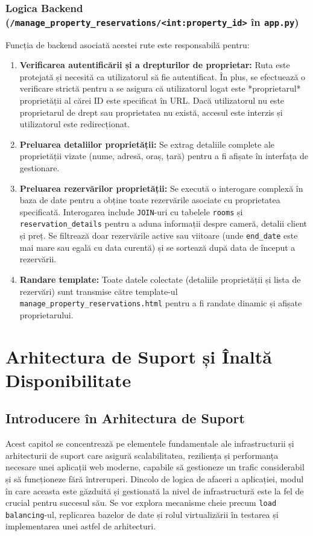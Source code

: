 \documentclass[12pt, a4paper, oneside, romanian]{teza-upb}
\begin{document}
\subsection{Logica Backend (\texttt{/manage\_property\_reservations/<int:property\_id>} în \texttt{app.py})}
Funcția de backend asociată acestei rute este responsabilă pentru:
\begin{enumerate}
	\item \textbf{Verificarea autentificării și a drepturilor de proprietar:} Ruta este protejată și necesită ca utilizatorul să fie autentificat. În plus, se efectuează o verificare strictă pentru a se asigura că utilizatorul logat este *proprietarul* proprietății al cărei ID este specificat în URL. Dacă utilizatorul nu este proprietarul de drept sau proprietatea nu există, accesul este interzis și utilizatorul este redirecționat.
	\item \textbf{Preluarea detaliilor proprietății:} Se extrag detaliile complete ale proprietății vizate (nume, adresă, oraș, țară) pentru a fi afișate în interfața de gestionare.
	\item \textbf{Preluarea rezervărilor proprietății:} Se execută o interogare complexă în baza de date pentru a obține toate rezervările asociate cu proprietatea specificată. Interogarea include \texttt{JOIN}-uri cu tabelele \texttt{rooms} și \texttt{reservation\_details} pentru a aduna informații despre cameră, detalii client și preț. Se filtrează doar rezervările active sau viitoare (unde \texttt{end\_date} este mai mare sau egală cu data curentă) și se sortează după data de început a rezervării.
	\item \textbf{Randare template:} Toate datele colectate (detaliile proprietății și lista de rezervări) sunt transmise către template-ul \texttt{manage\_property\_reservations.html} pentru a fi randate dinamic și afișate proprietarului.
\end{enumerate}



\chapter{Arhitectura de Suport și Înaltă Disponibilitate}

\section*{Introducere în Arhitectura de Suport}
Acest capitol se concentrează pe elementele fundamentale ale infrastructurii și arhitecturii de suport care asigură scalabilitatea, reziliența și performanța necesare unei aplicații web moderne, capabile să gestioneze un trafic considerabil și să funcționeze fără întreruperi. Dincolo de logica de afaceri a aplicației, modul în care aceasta este găzduită și gestionată la nivel de infrastructură este la fel de crucial pentru succesul său. Se vor explora mecanisme cheie precum \texttt{load balancing}-ul, replicarea bazelor de date și rolul virtualizării în testarea și implementarea unei astfel de arhitecturi.
\end{document}
